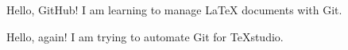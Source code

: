 \documentclass{article}
\begin{document}
Hello, GitHub! I am learning to manage LaTeX documents with Git.

Hello, again! I am trying to automate Git for TeXstudio.
\end{document}
